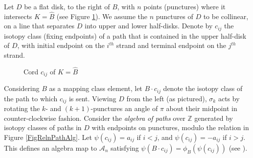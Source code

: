 \documentclass[11pt]{amsart}
\def\Z{{\mathbb Z}}
\def\cl{\mathcal}
\def\s{{\sigma}}
\begin{document}
  Let $D$ be a flat disk, to the right of $B$, with $n$ points (punctures) where it intersects $K=\widehat{B}$ (see Figure \ref{FigA_nGens}). We assume the $n$ punctures of $D$ to be collinear, on a line that separates $D$ into upper and lower half-disks. Denote by $c_{ij}$ the isotopy class (fixing endpoints) of a path that is contained in the upper half-disk of $D$, with initial endpoint on the $i^{th}$ strand and terminal endpoint on the $j^{th}$ strand.

  \begin{figure}[ht]
\caption{Cord $c_{ij}$ of $K=\widehat B$}
\label{FigA_nGens}
\end{figure}

  Considering $B$ as a mapping class element, let $B\cdot c_{ij}$ denote the isotopy class of the path to which $c_{ij}$ is sent. Viewing $D$ from the left (as pictured), $\s_k$ acts by rotating the $k\textrm{-}$ and $(k+1)\textrm{-}$punctures an angle of $\pi$ about their midpoint in counter-clockwise fashion. Consider the \emph{algebra of paths} over $\Z$ generated by isotopy classes of paths in $D$ with endpoints on punctures, modulo the relation in Figure \ref{FigRelnPathAlg}. Let $\psi(c_{ij})=a_{ij}$ if $i<j$, and $\psi(c_{ij})=-a_{ij}$ if $i>j$. This defines an algebra map to $\cl A_n$ satisfying $\psi(B\cdot c_{ij}) = \phi_B(\psi(c_{ij}))$ (see \cite{Ng05}).
\end{document}

